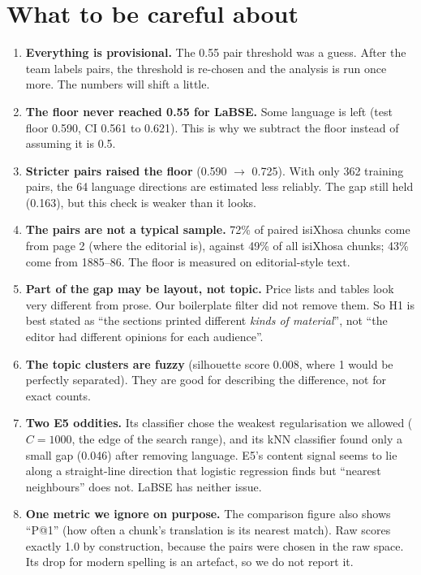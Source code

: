 \documentclass[11pt,a4paper]{article}
\begin{document}
\section{What to be careful about}\label{sec:caveats}
\begin{enumerate}
  \item \textbf{Everything is provisional.} The 0.55 pair threshold was a guess. After the team labels
  pairs, the threshold is re-chosen and the analysis is run once more. The numbers will shift a little.
  \item \textbf{The floor never reached 0.55 for LaBSE.} Some language is left (test floor 0.590, CI 0.561
  to 0.621). This is why we subtract the floor instead of assuming it is 0.5.
  \item \textbf{Stricter pairs raised the floor} (0.590 $\to$ 0.725). With only 362 training pairs, the
  64 language directions are estimated less reliably. The gap still held (0.163), but this check is
  weaker than it looks.
  \item \textbf{The pairs are not a typical sample.} 72\% of paired isiXhosa chunks come from page 2
  (where the editorial is), against 49\% of all isiXhosa chunks; 43\% come from 1885--86. The floor is
  measured on editorial-style text.
  \item \textbf{Part of the gap may be layout, not topic.} Price lists and tables look very different from
  prose. Our boilerplate filter did not remove them. So H1 is best stated as ``the sections printed
  different \emph{kinds of material}'', not ``the editor had different opinions for each audience''.
  \item \textbf{The topic clusters are fuzzy} (silhouette score 0.008, where 1 would be perfectly separated).
  They are good for describing the difference, not for exact counts.
  \item \textbf{Two E5 oddities.} Its classifier chose the weakest regularisation we allowed
  ($C{=}1000$, the edge of the search range), and its kNN classifier found only a small gap (0.046) after removing language. E5's
  content signal seems to lie along a straight-line direction that logistic regression finds but
  ``nearest neighbours'' does not. LaBSE has neither issue.
  \item \textbf{One metric we ignore on purpose.} The comparison figure also shows ``P@1'' (how often a
  chunk's translation is its nearest match). Raw scores exactly 1.0 by construction, because the pairs
  were chosen in the raw space. Its drop for modern spelling is an artefact, so we do not report it.
\end{enumerate}
\end{document}

